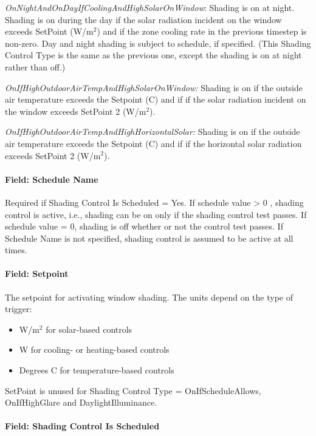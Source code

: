 \emph{OnNightAndOnDayIfCoolingAndHighSolarOnWindow}: Shading is on at night. Shading is on during the day if the solar radiation incident on the window exceeds SetPoint (W/m\(^{2}\)) and if the zone cooling rate in the previous timestep is non-zero. Day and night shading is subject to schedule, if specified. (This Shading Control Type is the same as the previous one, except the shading is on at night rather than off.)

\emph{OnIfHighOutdoorAirTempAndHighSolarOnWindow:} Shading is on if the outside air temperature exceeds the Setpoint (C) and if if the solar radiation incident on the window exceeds SetPoint 2 (W/m\(^{2}\)).

\emph{OnIfHighOutdoorAirTempAndHighHorizontalSolar:} Shading is on if the outside air temperature exceeds the Setpoint (C) and if if the horizontal solar radiation exceeds SetPoint 2 (W/m\(^{2}\)).

\paragraph{Field: Schedule Name}\label{field-schedule-name-007}

Required if Shading Control Is Scheduled = Yes. If schedule value \textgreater{} 0 , shading control is active, i.e., shading can be on only if the shading control test passes. If schedule value = 0, shading is off whether or not the control test passes. If Schedule Name is not specified, shading control is assumed to be active at all times.

\paragraph{Field: Setpoint}\label{field-setpoint}

The setpoint for activating window shading. The units depend on the type of trigger:

\begin{itemize}
\item
  W/m\(^{2}\) for solar-based controls
\item
  W for cooling- or heating-based controls
\item
  Degrees C for temperature-based controls
\end{itemize}

SetPoint is unused for Shading Control Type = OnIfScheduleAllows, OnIfHighGlare and DaylightIlluminance.

\paragraph{Field: Shading Control Is Scheduled}\label{field-shading-control-is-scheduled}

